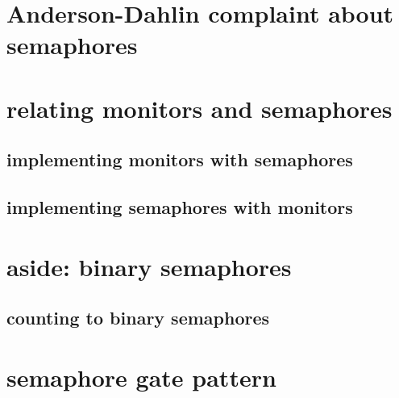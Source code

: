 
\section{Anderson-Dahlin complaint about semaphores}


\section{relating monitors and semaphores}

\subsection{implementing monitors with semaphores}

 

\subsection{implementing semaphores with monitors}



\section{aside: binary semaphores}



\subsection{counting to binary semaphores}


\section{semaphore gate pattern}

